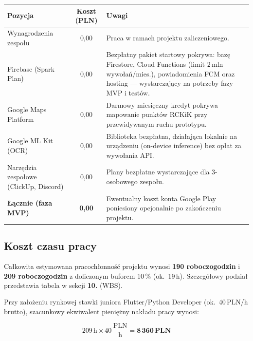 \documentclass[11pt, a4paper]{article}
\begin{document}
\begin{center}
\begin{tabularx}{\linewidth}{L{4.5cm} c X}
  \toprule
  \textbf{Pozycja} & \textbf{Koszt (PLN)} & \textbf{Uwagi} \\
  \midrule
  Wynagrodzenia zespołu
    & 0{,}00
    & Praca w ramach projektu zaliczeniowego. \\
  \addlinespace
  Firebase (Spark Plan)
    & 0{,}00
    & Bezpłatny pakiet startowy pokrywa: bazę Firestore, Cloud Functions
      (limit 2\,mln wywołań/mies.), powiadomienia FCM oraz hosting
      — wystarczający na potrzeby fazy MVP i testów. \\
  \addlinespace
  Google Maps Platform
    & 0{,}00
    & Darmowy miesięczny kredyt pokrywa mapowanie punktów RCKiK
      przy przewidywanym ruchu prototypu. \\
  \addlinespace
  Google ML Kit (OCR)
    & 0{,}00
    & Biblioteka bezpłatna, działająca lokalnie na urządzeniu
      (on-device inference) bez opłat za wywołania API. \\
  \addlinespace
  Narzędzia zespołowe (ClickUp, Discord)
    & 0{,}00
    & Plany bezpłatne wystarczające dla 3-osobowego zespołu. \\
  \midrule
  \textbf{Łącznie (faza MVP)}
    & \textbf{0{,}00}
    & Ewentualny koszt konta Google Play poniesiony opcjonalnie
      po zakończeniu projektu. \\
  \bottomrule
\end{tabularx}
\end{center}

\subsection{Koszt czasu pracy }

Całkowita estymowana pracochłonność projektu wynosi \textbf{190 roboczogodzin} i \textbf{209 roboczogodzin} z doliczonym buforem 10\,\% (ok.\ 19\,h).
Szczegółowy podział przedstawia tabela w sekcji \textbf{10.} (WBS).

Przy założeniu rynkowej stawki juniora Flutter/Python Developer
(ok.\ 40\,PLN/h brutto), szacunkowy ekwiwalent pieniężny nakładu pracy wynosi:

\[
  209\,\text{h} \times 40\,\frac{\text{PLN}}{\text{h}} = \mathbf{8\,360\,\text{PLN}}
\]


\end{document}
